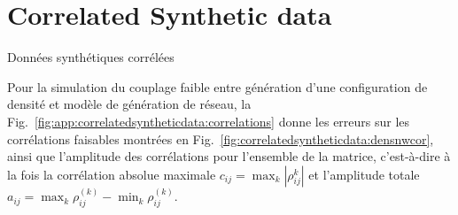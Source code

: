 
\newpage

\section{Correlated Synthetic data}{Données synthétiques corrélées}

\label{app:sec:correlatedsyntheticdata}


Pour la simulation du couplage faible entre génération d'une configuration de densité et modèle de génération de réseau, la Fig.~\ref{fig:app:correlatedsyntheticdata:correlations} donne les erreurs sur les corrélations faisables montrées en Fig.~\ref{fig:correlatedsyntheticdata:densnwcor}, ainsi que l'amplitude des corrélations pour l'ensemble de la matrice, c'est-à-dire à la fois la corrélation absolue maximale $c_{ij}=\max_k\left| \rho_{ij}^{k} \right|$ et l'amplitude totale $a_{ij}=\max_k{\rho_{ij}^{(k)}}-\min_k{\rho_{ij}^{(k)}}$.


